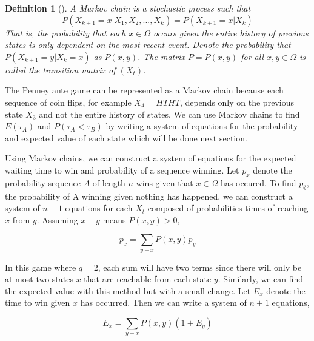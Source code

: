\documentclass{article}
\newtheorem{definition}[theorem]{Definition}
\numberwithin{mytheorem}{subsection} %
\begin{document}
		\begin{definition}[\cite{textbook}]
			A {\em Markov chain} is a stochastic process such that
			$$P(X_{k+1} = x | X_1, X_2, ..., X_k) = P(X_{k+1} = x  | X_k)$$
			That is, the probability that each $x \in \Omega$ occurs given the entire history of
			previous states is only dependent on the most recent event. Denote the probability
			that $P(X_{k+1}=y|X_k=x)$ as $P(x,y)$. The matrix $P = P(x,y)$ for all $x,y \in \Omega$ is called the transition matrix of $(X_t)$.
		\end{definition}

		The Penney ante game can be represented as a Markov chain because each sequence of coin flips, for example $X_4=HTHT$, depends only on the previous state $X_3$ and not the entire history of states. We can use Markov chains to find $E(\tau_A)$ and $P(\tau_A < \tau_B)$ by writing a system of equations for the probability and expected value of each state which will be done next section. 


		Using Markov chains, we can construct a system of equations for the expected waiting time to win and probability of a sequence winning. Let $p_{x}$ denote the probability sequence $A$ of length $n$ wins given that $x\in\Omega$ has occured. To find $p_\emptyset$, the probability of A winning given nothing has happened, we can construct a system of $n+1$ equations for each $X_t$ composed of probabilities times of reaching $x$ from $y$. Assuming $x$ -- $y$ means $P(x,y) > 0$,

		$$p_x = \sum_{y - x} P(x,y) p_y$$

		In this game where $q=2$, each sum will have two terms since there will only be at most two states $x$ that are reachable from each state $y$. Similarly, we can find the expected value with this method but with a small change. Let $E_x$ denote the time to win given $x$ has occurred. Then we can write a system of $n+1$ equations,

		$$E_x = \sum_{y - x} P(x,y) (1 + E_y)$$

\end{document}
